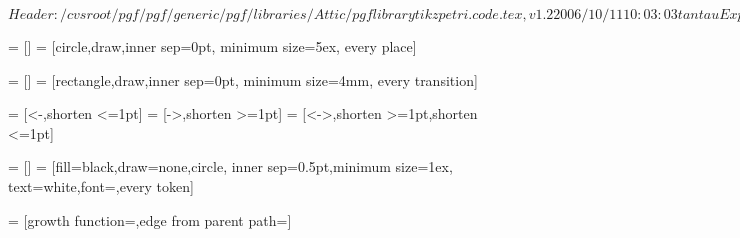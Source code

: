 \ProvidesFileRCS[v\pgfversion] $Header: /cvsroot/pgf/pgf/generic/pgf/libraries/Attic/pgflibrarytikzpetri.code.tex,v 1.2 2006/10/11 10:03:03 tantau Exp $

%




=           []
=                 [circle,draw,inner sep=0pt,
                                    minimum size=5ex,
                                    every place]



=      []
=            [rectangle,draw,inner sep=0pt,
                                    minimum size=4mm,
                                    every transition]



=                   [<-,shorten <=1pt]
=                  [->,shorten >=1pt]
=          [<->,shorten >=1pt,shorten <=1pt]




=           []
=                 [fill=black,draw=none,circle,
                                    inner sep=0.5pt,minimum size=1ex,
                                    text=white,font=\tiny,every token]

\def\tikz@token@distance{1.5ex}

=   [growth function=\tikz@grow@tokens,edge from parent path=]





